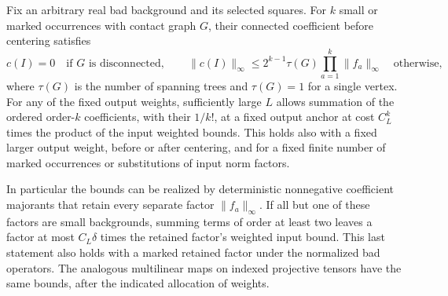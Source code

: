 \begin{lemma}
\label{block:tree}
Fix an arbitrary real bad background and its selected squares.  For
$k$ small or marked occurrences with contact graph $G$, their connected
coefficient before centering satisfies
\begin{equation}
 c(I)=0\quad\text{if }G\text{ is disconnected},\qquad
 \|c(I)\|_\infty\le
       2^{k-1}\tau(G)\prod_{a=1}^k\|f_a\|_\infty
       \quad\text{otherwise},
 \label{block:tree-coefficient}
\end{equation}
where $\tau(G)$ is the number of spanning trees and $\tau(G)=1$ for a
single vertex.  For any of the fixed output weights, sufficiently large
$L$ allows summation of the ordered order-$k$ coefficients, with their
$1/k!$, at a fixed output anchor at cost $C_L^k$ times the product of
the input weighted bounds.  This holds also with a fixed larger output
weight, before or after centering, and for a fixed finite number of
marked occurrences or substitutions of input norm factors.

In particular the bounds can be realized by deterministic nonnegative
coefficient majorants that retain every separate factor
$\|f_a\|_\infty$.  If all but one of these factors are small backgrounds,
summing terms of order at least two leaves a factor at most $C_L\delta$
times the retained factor's weighted input bound.  This last statement
also holds with a marked retained factor under the normalized bad
operators.  The analogous multilinear maps on indexed projective
tensors have the same bounds, after the indicated allocation of
weights.
\end{lemma}

